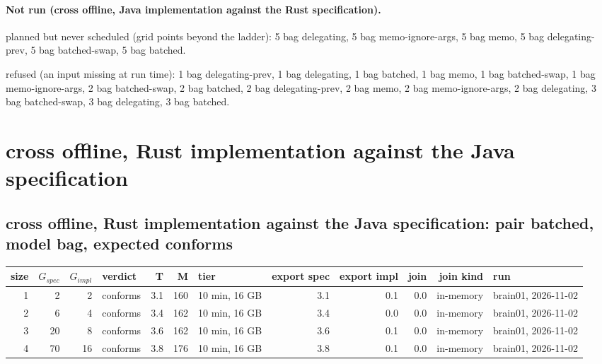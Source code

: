 \documentclass[10pt]{article}
\begin{document}
\paragraph{Not run (cross offline, Java implementation against the Rust specification).}
planned but never scheduled (grid points beyond the ladder): 5 bag delegating, 5 bag memo-ignore-args, 5 bag memo, 5 bag delegating-prev, 5 bag batched-swap, 5 bag batched.\par
refused (an input missing at run time): 1 bag delegating-prev, 1 bag delegating, 1 bag batched, 1 bag memo, 1 bag batched-swap, 1 bag memo-ignore-args, 2 bag batched-swap, 2 bag batched, 2 bag delegating-prev, 2 bag memo, 2 bag memo-ignore-args, 2 bag delegating, 3 bag batched-swap, 3 bag delegating, 3 bag batched.\par
\section*{cross offline, Rust implementation against the Java specification}
\subsection*{cross offline, Rust implementation against the Java specification: pair \textsf{batched}, model bag, expected conforms}
\begin{longtable}{@{}rrrlrrlrrrrl@{}}
\toprule
size & $G_{\mathit{spec}}$ & $G_{\mathit{impl}}$ & verdict & T & M & tier & export spec & export impl & join & join kind & run \\
\midrule
\endhead
\color{red} 1 & 2 & 2 & conforms & 3.1 & 160 & 10 min, 16 GB & 3.1 & 0.1 & 0.0 & in-memory & brain01, 2026-11-02 \\
\color{red} 2 & 6 & 4 & conforms & 3.4 & 162 & 10 min, 16 GB & 3.4 & 0.0 & 0.0 & in-memory & brain01, 2026-11-02 \\
\color{red} 3 & 20 & 8 & conforms & 3.6 & 162 & 10 min, 16 GB & 3.6 & 0.1 & 0.0 & in-memory & brain01, 2026-11-02 \\
\color{red} 4 & 70 & 16 & conforms & 3.8 & 176 & 10 min, 16 GB & 3.8 & 0.1 & 0.0 & in-memory & brain01, 2026-11-02 \\
\bottomrule
\end{longtable}
\end{document}
